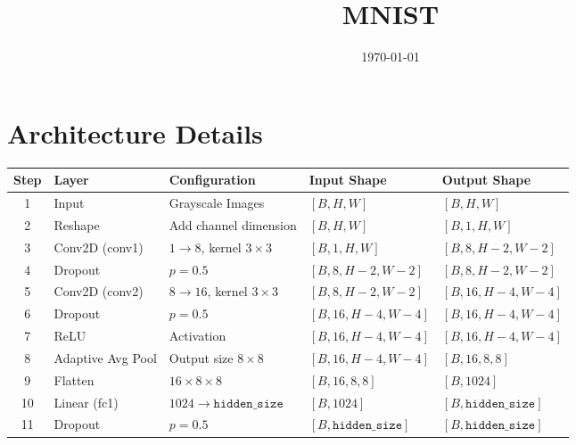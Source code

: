 \documentclass[11pt,a4paper]{article}
\title{\textbf{MNIST}}
\date{\today}
\begin{document}
\maketitle

\section{Architecture Details}

\begin{table}[h!]
\centering
\renewcommand{\arraystretch}{1.3}
\begin{tabular}{|c|l|l|l|l|}
\hline
\textbf{Step} & \textbf{Layer} & \textbf{Configuration} & \textbf{Input Shape} & \textbf{Output Shape} \\
\hline

1 & Input & Grayscale Images & 
$[B, H, W]$ &
$[B, H, W]$ \\

\hline
2 & Reshape & Add channel dimension &
$[B, H, W]$ &
$[B, 1, H, W]$ \\

\hline
3 & Conv2D (conv1) &
$1 \rightarrow 8$, kernel $3 \times 3$ &
$[B, 1, H, W]$ &
$[B, 8, H-2, W-2]$ \\

\hline
4 & Dropout &
$p = 0.5$ &
$[B, 8, H-2, W-2]$ &
$[B, 8, H-2, W-2]$ \\

\hline
5 & Conv2D (conv2) &
$8 \rightarrow 16$, kernel $3 \times 3$ &
$[B, 8, H-2, W-2]$ &
$[B, 16, H-4, W-4]$ \\

\hline
6 & Dropout &
$p = 0.5$ &
$[B, 16, H-4, W-4]$ &
$[B, 16, H-4, W-4]$ \\

\hline
7 & ReLU &
Activation &
$[B, 16, H-4, W-4]$ &
$[B, 16, H-4, W-4]$ \\

\hline
8 & Adaptive Avg Pool &
Output size $8 \times 8$ &
$[B, 16, H-4, W-4]$ &
$[B, 16, 8, 8]$ \\

\hline
9 & Flatten &
$16 \times 8 \times 8$ &
$[B, 16, 8, 8]$ &
$[B, 1024]$ \\

\hline
10 & Linear (fc1) &
$1024 \rightarrow \texttt{hidden\_size}$ &
$[B, 1024]$ &
$[B, \texttt{hidden\_size}]$ \\

\hline
11 & Dropout &
$p = 0.5$ &
$[B, \texttt{hidden\_size}]$ &
$[B, \texttt{hidden\_size}]$ \\


\end{tabular}
\end{table}
\end{document}
